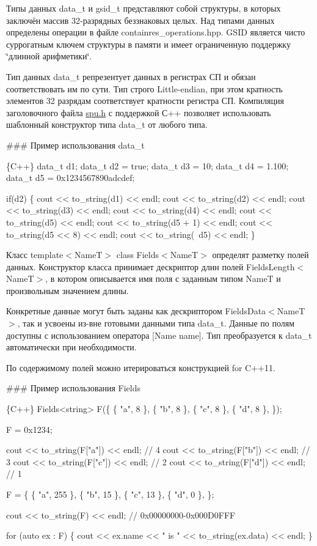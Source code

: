 Типы данных {\ttfamily data\+\_\+t} и {\ttfamily gsid\+\_\+t} представляют собой структуры, в которых заключён массив 32-\/разрядных беззнаковых целых. Над типами данных определены операции в файле {\ttfamily containres\+\_\+operations.\+hpp}. G\+S\+ID является чисто суррогатным ключем структуры в памяти и имеет ограниченную поддержку \char`\"{}длинной арифметики\char`\"{}.

Тип данных {\ttfamily data\+\_\+t} репрезентует данных в регистрах СП и обязан соответствовать им по сути. Тип строго Little-\/endian, при этом кратность элементов 32 разрядам соответствует кратности регистра СП. Компиляция заголовочного файла {\ttfamily \hyperlink{spu_8h_source}{spu.\+h}} с поддержкой С++ позволяет использовать шаблонный конструктор типа {\ttfamily data\+\_\+t} от любого типа.

\#\#\# Пример использования {\ttfamily data\+\_\+t} 
\begin{DoxyCode}
\{C++\}
  data\_t d1;
  data\_t d2 = true;
  data\_t d3 = 10;
  data\_t d4 = 1.100;
  data\_t d5 = 0x1234567890adcdef;

  if(d2)
  \{
    cout << to\_string(d1) << endl;
    cout << to\_string(d2) << endl;
    cout << to\_string(d3) << endl;
    cout << to\_string(d4) << endl;
    cout << to\_string(d5) << endl;
    cout << to\_string(d5 + 1) << endl;
    cout << to\_string(d5 << 8) << endl;
    cout << to\_string(~d5) << endl;
  \}
\end{DoxyCode}
 



Класс {\ttfamily template$<$NameT$>$ class Fields$<$NameT$>$} определят разметку полей данных. Конструктор класса принимает дескриптор длин полей {\ttfamily Fields\+Length$<$NameT$>$}, в котором описывается имя поля с заданным типом NameT и произвольным значением длины.

Конкретные данные могут быть заданы как дескриптором {\ttfamily Fields\+Data$<$NameT$>$}, так и усвоены из-\/вне готовыми данными типа {\ttfamily data\+\_\+t}. Данные по полям доступны с использованием оператора {\ttfamily \mbox{[}Name name\mbox{]}}. Тип преобразуется к {\ttfamily data\+\_\+t} автоматически при необходимости.

По содержимому полей можно итерироваться конструкцией for C++11.

\#\#\# Пример использования {\ttfamily Fields} 
\begin{DoxyCode}
\{C++\}
  Fields<string> F(\{
    \{ "a", 8 \},
    \{ "b", 8 \},
    \{ "c", 8 \},
    \{ "d", 8 \},
  \});

  F = 0x1234;

  cout << to\_string(F["a"]) << endl; // 4
  cout << to\_string(F["b"]) << endl; // 3
  cout << to\_string(F["c"]) << endl; // 2
  cout << to\_string(F["d"]) << endl; // 1

  F = \{
    \{ "a", 255 \},
    \{ "b", 15  \},
    \{ "c", 13  \},
    \{ "d", 0   \},
  \};

  cout << to\_string(F) << endl; // 0x00000000-0x000D0FFF

  for (auto ex : F)
  \{
    cout << ex.name << " is " << to\_string(ex.data) << endl;
  \}
\end{DoxyCode}


